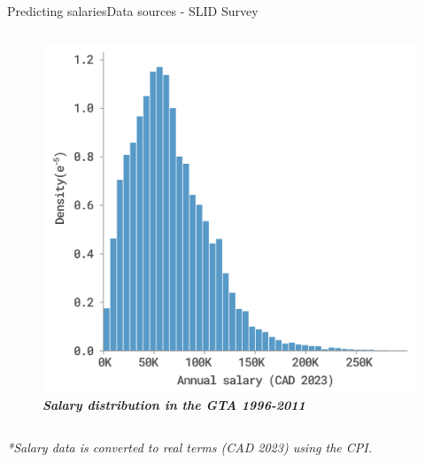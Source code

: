 \documentclass[aspectratio=169, xcolor=dvipsnames]{beamer}
\begin{document}
\begin{frame}{Predicting salaries}{Data sources - SLID Survey}
\begin{columns}
\begin{figure}
                \includegraphics[width=1.0\textwidth]{./images/salary_dist.png}
                \captionsetup{labelformat=empty}
                \setlength{\abovecaptionskip}{-5pt}
                \caption{\fontsize{8pt}{8pt}\selectfont \textbf{\textit{Salary distribution in the GTA 1996-2011}}}
            \end{figure}
        \end{columns}
    \centering \textit{*Salary data is converted to real terms (CAD 2023) using the CPI.}
\end{frame}
\end{document}

